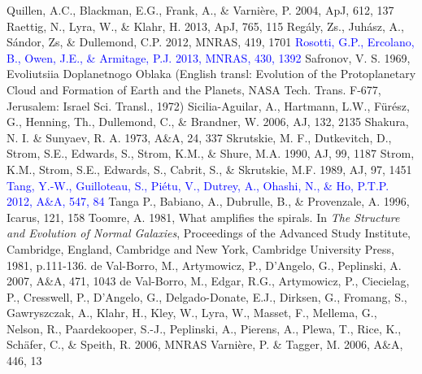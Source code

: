 \documentclass[apj]{emulateapj}
\def\blue#1{\textcolor{blue}{#1}}
\begin{document}
\begin{thebibliography}{}
 Quillen, A.C., Blackman, E.G., Frank, A., \& Varni\`ere, P. 2004, ApJ, 612, 137
 Raettig, N., Lyra, W., \& Klahr, H. 2013, ApJ, 765, 115
 Reg\'aly, Zs., Juh\'asz, A., S\'andor, Zs, \& Dullemond, C.P. 2012, MNRAS, 419, 1701
\bibitem[{{\blue{Rosotti et al.}}(2013)}]{Rosotti13} \blue{Rosotti, G.P., Ercolano, B., Owen, J.E., \& Armitage, P.J. 2013, MNRAS, 430, 1392} 
 Safronov, V. S. 1969, Evoliutsiia Doplanetnogo Oblaka (English transl: Evolution of the Protoplanetary Cloud and Formation of Earth and the Planets, NASA Tech. Trans. F-677, Jerusalem: Israel Sci. Transl., 1972)
 Sicilia-Aguilar, A., Hartmann, L.W., F\"ur\'esz, G., Henning, Th., Dullemond, C., \& Brandner, W. 2006, AJ, 132, 2135
 Shakura, N. I. \& Sunyaev, R. A. 1973, A\&A, 24, 337
 Skrutskie, M. F., Dutkevitch, D., Strom, S.E., Edwards, S., Strom, K.M., \& Shure, M.A. 1990, AJ, 99, 1187
 Strom, K.M., Strom, S.E., Edwards, S., Cabrit, S., \& Skrutskie, M.F. 1989, AJ, 97, 1451
\bibitem[{{\blue{Tang et al.}}(2012)}]{Tang12} \blue{Tang, Y.-W., Guilloteau, S., Pi\'etu, V., Dutrey, A., Ohashi, N., \& Ho, P.T.P. 2012, A\&A, 547, 84}
 Tanga P., Babiano, A., Dubrulle, B., \& Provenzale, A. 1996, Icarus, 121, 158
 Toomre, A. 1981, What amplifies the spirals. In {\it The Structure and Evolution of Normal Galaxies}, Proceedings of the Advanced Study Institute, Cambridge, England, Cambridge and New York, Cambridge University Press, 1981, p.111-136.
de Val-Borro, M., Artymowicz, P., D'Angelo, G., Peplinski, A. 2007, A\&A, 471, 1043
de Val-Borro, M., Edgar, R.G., Artymowicz, P., Ciecielag, P., Cresswell, P., D'Angelo, G., Delgado-Donate, E.J., Dirksen, G., Fromang, S., Gawryszczak, A., Klahr, H., Kley, W., Lyra, W., Masset, F., Mellema, G., Nelson, R., Paardekooper, S.-J., Peplinski, A., Pierens, A., Plewa, T., Rice, K., Sch\"afer, C., \& Speith, R. 2006, MNRAS
 Varni\`ere, P. \& Tagger, M. 2006, A\&A, 446, 13

\end{thebibliography}
\end{document}
